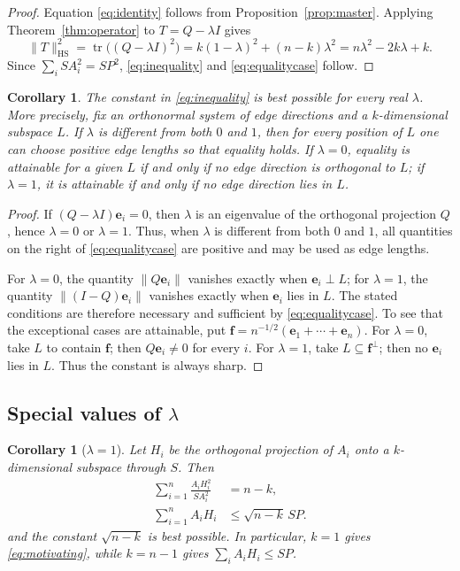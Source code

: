 \documentclass[11pt]{article}
\newtheorem{corollary}[theorem]{Corollary}
\theoremstyle{definition}
\theoremstyle{remark}
\DeclareMathOperator{\tr}{tr}
\newcommand{\HS}{\mathrm{HS}}
\newcommand{\be}{\mathbf e}
\newcommand{\bff}{\mathbf f}
\newcommand{\norm}[1]{\lVert #1 \rVert}
\begin{document}
\begin{proof}
Equation \eqref{eq:identity} follows from Proposition~\ref{prop:master}. Applying
Theorem~\ref{thm:operator} to $T=Q-\lambda I$ gives
\[
\norm{T}_{\HS}^{2}
=
\tr\bigl((Q-\lambda I)^2\bigr)
=
k(1-\lambda)^2+(n-k)\lambda^2
=
n\lambda^2-2k\lambda+k.
\]
Since $\sum_iSA_i^2=SP^2$, \eqref{eq:inequality} and \eqref{eq:equalitycase} follow.
\end{proof}

\begin{corollary}\label{cor:sharp}
The constant in \eqref{eq:inequality} is best possible for every real $\lambda$. More
precisely, fix an orthonormal system of edge directions and a $k$-dimensional subspace $L$.
If $\lambda$ is different from both $0$ and $1$, then for every position of $L$ one can choose positive edge
lengths so that equality holds. If $\lambda=0$, equality is attainable for a given $L$
if and only if no edge direction is orthogonal to $L$; if $\lambda=1$, it is attainable if
and only if no edge direction lies in $L$.
\end{corollary}

\begin{proof}
If $(Q-\lambda I)\be_i=0$, then $\lambda$ is an eigenvalue of the orthogonal projection
$Q$, hence $\lambda=0$ or $\lambda=1$. Thus, when $\lambda$ is different from both $0$ and $1$, all quantities on the
right of \eqref{eq:equalitycase} are positive and may be used as edge lengths.

For $\lambda=0$, the quantity $\norm{Q\be_i}$ vanishes exactly when $\be_i\perp L$; for
$\lambda=1$, the quantity $\norm{(I-Q)\be_i}$ vanishes exactly when $\be_i$ lies in $L$. The
stated conditions are therefore necessary and sufficient by \eqref{eq:equalitycase}.
To see that the exceptional cases are attainable, put
$\bff=n^{-1/2}(\be_1+\cdots+\be_n)$. For $\lambda=0$, take $L$ to contain $\bff$; then
$Q\be_i\ne0$ for every $i$. For $\lambda=1$, take $L\subseteq\bff^\perp$; then no $\be_i$
lies in $L$. Thus the constant is always sharp.
\end{proof}

\subsection{Special values of \texorpdfstring{$\lambda$}{lambda}}

\begin{corollary}[$\lambda=1$]\label{cor:lambda1}
Let $H_i$ be the orthogonal projection of $A_i$ onto a $k$-dimensional subspace through $S$.
Then
\begin{equation}\label{eq:lambda1}
\begin{aligned}
\sum_{i=1}^{n}\frac{A_iH_i^{2}}{SA_i^{2}}&=n-k,\\
\sum_{i=1}^{n}A_iH_i&\le\sqrt{n-k}\,SP.
\end{aligned}
\end{equation}
and the constant $\sqrt{n-k}$ is best possible. In particular, $k=1$ gives
\eqref{eq:motivating}, while $k=n-1$ gives $\sum_iA_iH_i\le SP$.
\end{corollary}
\end{document}
